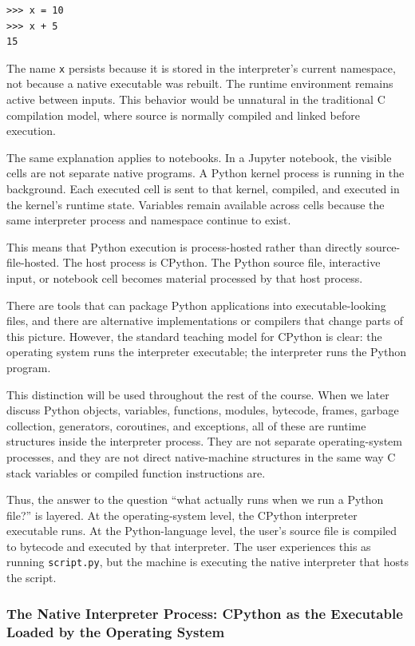\documentclass[a4paper,twoside]{report}
\begin{document}
\begin{verbatim}
>>> x = 10
>>> x + 5
15
\end{verbatim}

The name \texttt{x} persists because it is stored in the interpreter's current namespace, not because a native executable was rebuilt. The runtime environment remains active between inputs. This behavior would be unnatural in the traditional C compilation model, where source is normally compiled and linked before execution.

The same explanation applies to notebooks. In a Jupyter notebook, the visible cells are not separate native programs. A Python kernel process is running in the background. Each executed cell is sent to that kernel, compiled, and executed in the kernel's runtime state. Variables remain available across cells because the same interpreter process and namespace continue to exist.

This means that Python execution is process-hosted rather than directly source-file-hosted. The host process is CPython. The Python source file, interactive input, or notebook cell becomes material processed by that host process.

There are tools that can package Python applications into executable-looking files, and there are alternative implementations or compilers that change parts of this picture. However, the standard teaching model for CPython is clear: the operating system runs the interpreter executable; the interpreter runs the Python program.

This distinction will be used throughout the rest of the course. When we later discuss Python objects, variables, functions, modules, bytecode, frames, garbage collection, generators, coroutines, and exceptions, all of these are runtime structures inside the interpreter process. They are not separate operating-system processes, and they are not direct native-machine structures in the same way C stack variables or compiled function instructions are.

Thus, the answer to the question ``what actually runs when we run a Python file?'' is layered. At the operating-system level, the CPython interpreter executable runs. At the Python-language level, the user's source file is compiled to bytecode and executed by that interpreter. The user experiences this as running \texttt{script.py}, but the machine is executing the native interpreter that hosts the script.


\subsubsection{The Native Interpreter Process: CPython as the Executable Loaded by the Operating System}
\end{document}
